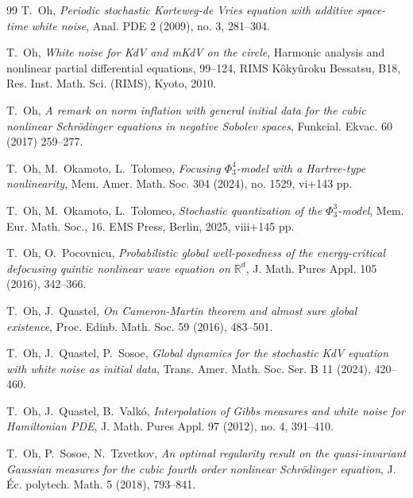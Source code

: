 \documentclass[letterpaper, 11pt,  reqno]{amsart}
\newcommand{\1}{\hspace{0.5mm}\text{I}\hspace{0.5mm}}
\newcommand{\R}{\mathbb{R}}
\numberwithin{equation}{section}
\numberwithin{theorem}{section}
\begin{document}
\begin{thebibliography}{99}
T.~Oh, 
{\it Periodic stochastic Korteweg-de Vries equation with additive space-time white noise}, 
Anal. PDE 2 (2009), no. 3, 281--304. 




T.~Oh,
{\it White noise for KdV and mKdV on the circle},
Harmonic analysis and nonlinear partial differential equations, 99--124, 
RIMS K\^oky\^uroku Bessatsu, B18, Res. Inst. Math. Sci. (RIMS), Kyoto, 2010.


T.~Oh,
{\it A remark on norm inflation with general initial data for the cubic nonlinear Schr\"odinger equations in negative Sobolev spaces}, Funkcial. Ekvac. 60 (2017) 259--277. 

T.~Oh, M.~Okamoto, L.~Tolomeo,
{\it Focusing $\Phi^4_3$-model with a Hartree-type nonlinearity}, 
Mem. Amer. Math. Soc. 304 (2024), no. 1529, vi+143 pp. 



T.~Oh, M.~Okamoto, L.~Tolomeo,
{\it Stochastic quantization of the $\Phi^3_3$-model}, 
Mem. Eur. Math. Soc., 16. EMS Press, Berlin, 2025, viii+145 pp. 



%
%
%


T.~Oh, O.~Pocovnicu,
{\it  Probabilistic global well-posedness of the energy-critical defocusing quintic nonlinear wave equation on $\R^d$}, J. Math. Pures Appl. 105 (2016), 342--366. 



T.~Oh, J.~Quastel,
{\it  On Cameron-Martin theorem and almost sure global existence}, 
Proc. Edinb. Math. Soc. 59 (2016), 483--501. 


T.~Oh, J.~Quastel, P.~Sosoe,
{\it Global dynamics for the stochastic KdV equation with white noise as initial data},
Trans. Amer. Math. Soc. Ser. B 11 (2024), 420--460.



T.~Oh, J.~Quastel, B.~Valk\'o,
{\it  Interpolation of Gibbs measures and white noise for Hamiltonian PDE},
J. Math. Pures Appl. 97 (2012), no. 4, 391--410. 


T.~Oh, P.~Sosoe, N.~Tzvetkov,
{\it  An optimal regularity result on the quasi-invariant Gaussian measures for the cubic fourth order nonlinear Schr\"odinger equation},  
J. \'Ec. polytech. Math. 5 (2018), 793--841. 





\end{thebibliography}
\end{document}
